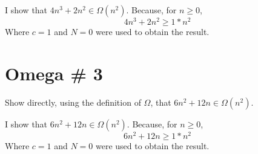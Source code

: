 \documentclass[11pt]{article}
\begin{document}
\bigskip
\bigskip
\noindent
I show that $4n^3+2n^2 \in \Omega(n^2)$. Because, for $n \geq 0$,
\begin{equation*}
4n^3+2n^2 \geq 1*n^2
\end{equation*}
Where $c=1$ and $N=0$ were used to obtain the result.


\section{Omega \# 3}
Show directly, using the definition of $\Omega$, that $6n^2+12n \in \Omega(n^2)$.


\bigskip
\bigskip
\noindent
I show that $6n^2+12n \in \Omega(n^2)$. Because, for $n \geq 0$,
\begin{equation*}
6n^2+12n \geq 1*n^2
\end{equation*}
Where $c=1$ and $N=0$ were used to obtain the result.












\end{document}
